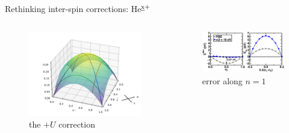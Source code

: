 \documentclass[xcolor=table,aspectratio=169]{beamer}
\numberwithin{equation}{section}
\begin{document}
\begin{frame}{Rethinking inter-spin corrections: He$\textsuperscript{\emph{x}+}$}
\begin{columns}
        \vspace{-6ex}
        \begin{figure}
            \includegraphics[width=\columnwidth]{figures/u_correction_with_paths.pdf}
            \caption{the $+U$ correction}
        \end{figure}


        \begin{figure}
            \includegraphics[width=\columnwidth]{figures/fig_bajaj_u_worsens_sce.jpeg}
            \caption{error along $n = 1$}
        \end{figure}


\end{columns}
\end{frame}
\end{document}

